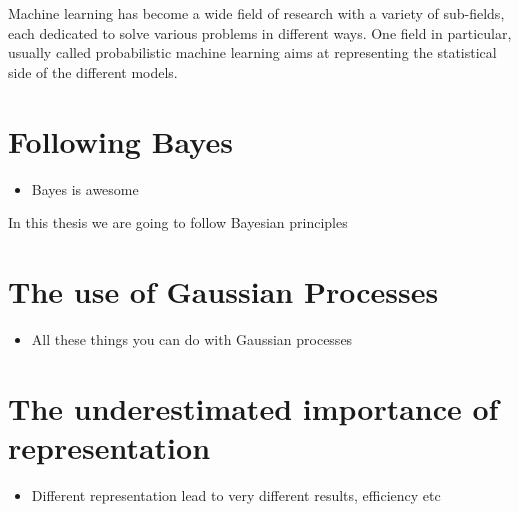 
\ifpdf
    \graphicspath{{1_introduction/figures/PNG/}{1_introduction/figures/PDF/}{1_introduction/figures/}}
\else
    \graphicspath{{1_introduction/figures/EPS/}{1_introduction/figures/}}
\fi


Machine learning has become a wide field of research with a variety of sub-fields, each dedicated to solve various problems in different ways.
One field in particular, usually called probabilistic machine learning aims at representing the statistical side of the different models.


\section{Following Bayes}

\begin{itemize}
\item Bayes is awesome
\end{itemize}

In this thesis we are going to follow Bayesian principles

\section{The use of Gaussian Processes}

\begin{itemize}
\item All these things you can do with Gaussian processes
\end{itemize}

\section{The underestimated importance of representation}

\begin{itemize}
\item Different representation lead to very different results, efficiency etc
\end{itemize}


